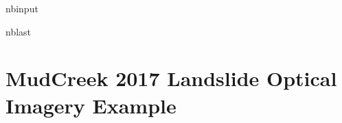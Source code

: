 \documentclass[letterpaper,10pt,english]{sphinxmanual}
\begin{document}
\begin{sphinxuseclass}{nbinput}
\begin{sphinxuseclass}{nblast}
{
\begin{sphinxVerbatim}[commandchars=\\\{\}]
\llap{\color{nbsphinxin}[ ]:\,\hspace{\fboxrule}\hspace{\fboxsep}}
                                    
\end{sphinxVerbatim}
}

\end{sphinxuseclass}
\end{sphinxuseclass}
\sphinxstepscope


\section{MudCreek 2017 Landslide Optical Imagery Example}
\label{\detokenize{notebooks/MudCreek_Landslide_optical:MudCreek-2017-Landslide-Optical-Imagery-Example}}\label{\detokenize{notebooks/MudCreek_Landslide_optical::doc}}
\end{document}
